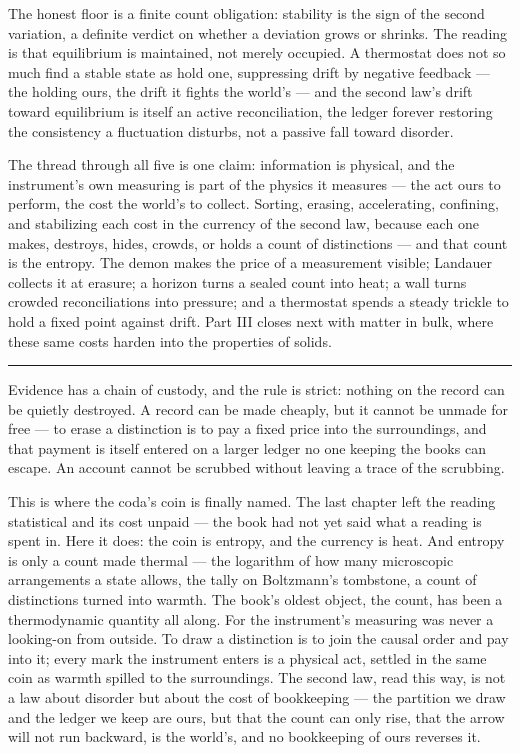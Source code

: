 The honest floor is a finite count obligation: stability is the sign of the second variation, a definite
verdict on whether a deviation grows or shrinks. The reading is that equilibrium is maintained, not merely
occupied. A thermostat does not so much find a stable state as hold one, suppressing drift by negative
feedback --- the holding ours, the drift it fights the world's --- and the second law's drift toward
equilibrium is itself an active reconciliation, the ledger forever restoring the consistency a fluctuation
disturbs, not a passive fall toward disorder.

\bigskip

The thread through all five is one claim: information is physical, and the instrument's own measuring is part
of the physics it measures --- the act ours to perform, the cost the world's to collect. Sorting, erasing, accelerating, confining, and stabilizing each cost in the
currency of the second law, because each one makes, destroys, hides, crowds, or holds a count of distinctions
--- and that count is the entropy. The demon makes the price of a measurement visible; Landauer collects it at
erasure; a horizon turns a sealed count into heat; a wall turns crowded reconciliations into pressure; and a
thermostat spends a steady trickle to hold a fixed point against drift. Part III closes next with matter in
bulk, where these same costs harden into the properties of solids.

\bigskip
\begin{center}
\rule{0.4\textwidth}{0.4pt}
\end{center}
\bigskip

\noindent Evidence has a chain of custody, and the rule is strict: nothing on the record can be quietly
destroyed. A record can be made cheaply, but it cannot be unmade for free --- to erase a distinction is to pay a
fixed price into the surroundings, and that payment is itself entered on a larger ledger no one keeping the
books can escape. An account cannot be scrubbed without leaving a trace of the scrubbing.

This is where the coda's coin is finally named. The last chapter left the reading statistical and its cost
unpaid --- the book had not yet said what a reading is spent in. Here it does: the coin is entropy, and the
currency is heat. And entropy is only a count made thermal --- the logarithm of how many microscopic
arrangements a state allows, the tally on Boltzmann's tombstone, a count of distinctions turned into warmth. The
book's oldest object, the count, has been a thermodynamic quantity all along. For the instrument's measuring was never a looking-on from outside. To draw a distinction is
to join the causal order and pay into it; every mark the instrument enters is a physical act, settled in the
same coin as warmth spilled to the surroundings. The second law, read this way, is not a law about disorder but
about the cost of bookkeeping --- the partition we draw and the ledger we keep are ours, but that the count can
only rise, that the arrow will not run backward, is the world's, and no bookkeeping of ours reverses it.

